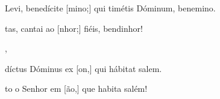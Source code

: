 {  {\item {} Levi, benedícite [mino;] qui timétis Dóminum, benemino.~\Antiphona}%
    {\item {}tas, cantai ao [nhor;] fiéis, bendi\-nhor!~\Antiphona},
  {\item {}díctus Dóminus ex [on,] qui hábitat \-sa\-lem.~\Antiphona}%
    {\item {}to o Senhor em [ão,] que habita \-sa\-lém!~\Antiphona}
}